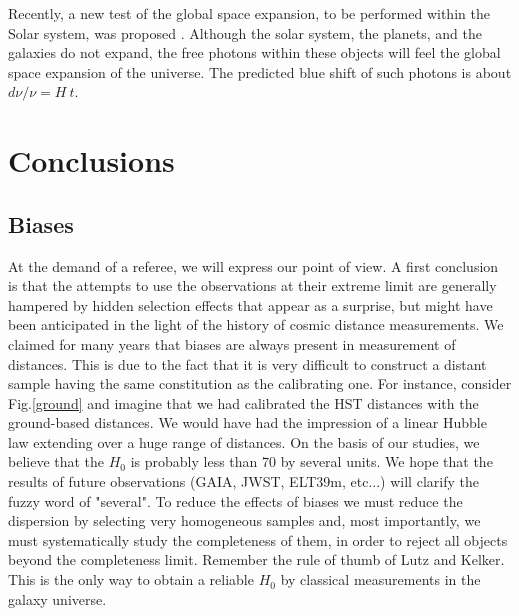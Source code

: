 	Recently, a new test of the global space expansion, to be performed within the Solar system, was proposed \cite{kope,kope2}. Although the solar system, the planets, and the galaxies do not expand, the free photons within these objects will feel the global space expansion of the universe. The predicted blue shift of such photons is about $d \nu / \nu = H \ t$.






\section{Conclusions  }
\label{sec5}
\subsection{Biases }
\label{sec5.1}
At the demand of a referee, we will express our point of view.
A first conclusion is that the attempts to use the observations at their extreme limit are generally hampered by hidden selection effects that appear as a surprise, but might have been anticipated in the light of the history of cosmic distance measurements. 
We claimed for many years that biases are always present in measurement of distances. This is due to the fact that it is very difficult to construct a distant sample having the same constitution as the calibrating one. For instance, consider Fig.\ref{ground} and imagine that we had calibrated the HST distances with the ground-based distances. We would have had the impression of a linear Hubble law extending over a huge range of distances. 
On the basis of our studies, we believe that the $H_0$ is probably  less than 70 by several units. We hope that the results of future observations (GAIA, JWST, ELT39m, etc...) will clarify the fuzzy word of "several".
To reduce the effects of biases we must reduce the dispersion by selecting very homogeneous samples and, most importantly, we must systematically study the completeness of them, in order to reject  all objects beyond the completeness limit. Remember the rule of thumb of Lutz and Kelker. This is the only way to obtain a reliable $H_0$ by classical measurements in the galaxy universe.

